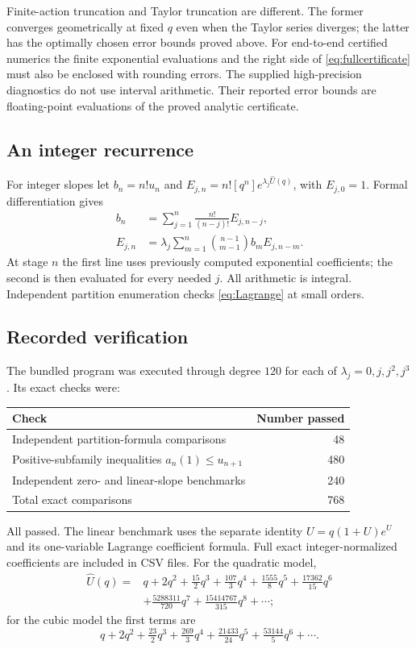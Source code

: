 \documentclass[11pt,a4paper]{article}
\numberwithin{equation}{section}
\theoremstyle{definition}\newtheorem{definition}[theorem]{Definition}
\theoremstyle{remark}\newtheorem{remark}[theorem]{Remark}
\newcommand{\Uhat}{\widehat U}\newcommand{\Qhat}{\widehat Q}\newcommand{\Vhat}{\widehat V}
\begin{document}
Finite-action truncation and Taylor truncation are different. The former
converges geometrically at fixed $q$ even when the Taylor series diverges;
the latter has the optimally chosen error bounds proved above.
For end-to-end certified numerics the finite exponential evaluations and
the right side of \eqref{eq:fullcertificate} must also be enclosed with
rounding errors. The supplied high-precision diagnostics do not use
interval arithmetic. Their reported error bounds are floating-point
evaluations of the proved analytic certificate.

\subsection{An integer recurrence}
For integer slopes let $b_n=n!u_n$ and
$E_{j,n}=n![q^n]e^{\lambda_j\Uhat(q)}$, with $E_{j,0}=1$.
Formal differentiation gives
\begin{align}
 b_n&=\sum_{j=1}^n\frac{n!}{(n-j)!}E_{j,n-j},\label{eq:integerU}\\
 E_{j,n}&=\lambda_j\sum_{m=1}^n
              \binom{n-1}{m-1}b_mE_{j,n-m}.\label{eq:integerexp}
\end{align}
At stage $n$ the first line uses previously computed exponential
coefficients; the second is then evaluated for every needed $j$.
All arithmetic is integral. Independent partition enumeration checks
\eqref{eq:Lagrange} at small orders.

\subsection{Recorded verification}
The bundled program was executed through degree $120$ for each of
$\lambda_j=0,j,j^2,j^3$. Its exact checks were:
\begin{center}
\begin{tabular}{@{}lr@{}}\toprule
Check & Number passed\\\midrule
Independent partition-formula comparisons & 48\\
Positive-subfamily inequalities $a_n(1)\le u_{n+1}$ & 480\\
Independent zero- and linear-slope benchmarks & 240\\\midrule
Total exact comparisons & 768\\\bottomrule
\end{tabular}
\end{center}
All passed. The linear benchmark uses the separate identity
$U=q(1+U)e^U$ and its one-variable Lagrange coefficient formula.
Full exact integer-normalized coefficients are included in CSV files.
For the quadratic model,
\begin{align*}
 \Uhat(q)={}&q+2q^2+\tfrac{15}{2}q^3+\tfrac{107}{3}q^4
 +\tfrac{1555}{8}q^5+\tfrac{17362}{15}q^6\\
 &+\tfrac{5288311}{720}q^7+\tfrac{15414767}{315}q^8+\cdots;
\end{align*}
for the cubic model the first terms are
\[
 q+2q^2+\tfrac{23}{2}q^3+\tfrac{269}{3}q^4
        +\tfrac{21433}{24}q^5+\tfrac{53144}{5}q^6+\cdots.
\]
\end{document}
